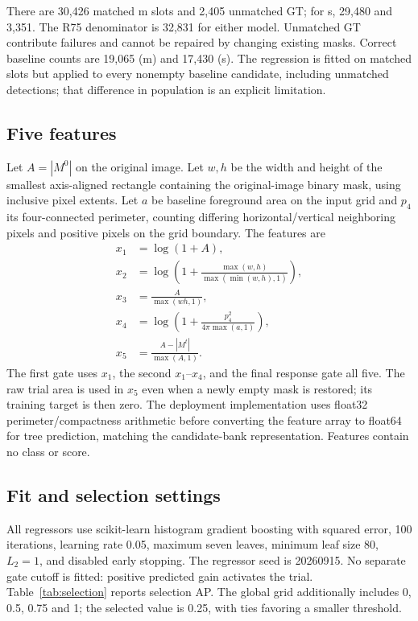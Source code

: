 \documentclass[11pt,a4paper]{article}
\begin{document}
There are 30,426 matched m slots and 2,405 unmatched GT; for s, 29,480 and 3,351. The R75 denominator is 32,831 for either model. Unmatched GT contribute failures and cannot be repaired by changing existing masks. Correct baseline counts are 19,065 (m) and 17,430 (s). The regression is fitted on matched slots but applied to every nonempty baseline candidate, including unmatched detections; that difference in population is an explicit limitation.

\subsection{Five features}
Let $A=|M^0|$ on the original image. Let $w,h$ be the width and height of the smallest axis-aligned rectangle containing the original-image binary mask, using inclusive pixel extents. Let $a$ be baseline foreground area on the input grid and $p_4$ its four-connected perimeter, counting differing horizontal/vertical neighboring pixels and positive pixels on the grid boundary. The features are
\begin{align}
 x_1&=\log(1+A),\\
 x_2&=\log\!\left(1+\frac{\max(w,h)}{\max(\min(w,h),1)}\right),\\
 x_3&=\frac{A}{\max(wh,1)},\\
 x_4&=\log\!\left(1+\frac{p_4^2}{4\pi\max(a,1)}\right),\\
 x_5&=\frac{A-|M^t|}{\max(A,1)}.
\end{align}
The first gate uses $x_1$, the second $x_1$--$x_4$, and the final response gate all five. The raw trial area is used in $x_5$ even when a newly empty mask is restored; its training target is then zero. The deployment implementation uses float32 perimeter/compactness arithmetic before converting the feature array to float64 for tree prediction, matching the candidate-bank representation. Features contain no class or score.

\subsection{Fit and selection settings}
All regressors use scikit-learn histogram gradient boosting with squared error, 100 iterations, learning rate 0.05, maximum seven leaves, minimum leaf size 80, $L_2=1$, and disabled early stopping. The regressor seed is 20260915. No separate gate cutoff is fitted: positive predicted gain activates the trial. Table~\ref{tab:selection} reports selection AP. The global grid additionally includes 0, 0.5, 0.75 and 1; the selected value is 0.25, with ties favoring a smaller threshold.
\end{document}
